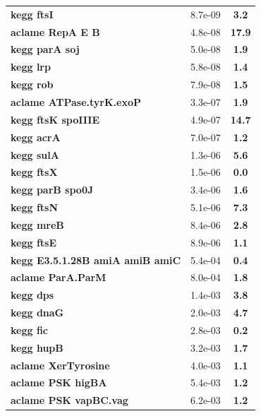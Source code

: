 \begin{landscape}
\begin{table}
{\begin{minipage}[t]{0.3\textwidth}
\begin{tabular}{>{\bfseries}p{\textwidth}cc}
\rowcolor{posit}kegg ftsI&8.7e-09&\textbf{\colorbox{colorpowerx}{3.2}}\\
\rowcolor{posit}aclame RepA E B&4.8e-08&\textbf{\colorbox{colorpowerxx}{17.9}}\\
\rowcolor{posit}kegg parA soj&5.0e-08&\textbf{\colorbox{colorpower}{1.9}}\\
\rowcolor{posit}kegg lrp&5.8e-08&\textbf{\colorbox{colorpower}{1.4}}\\
\rowcolor{posit}kegg rob&7.9e-08&\textbf{\colorbox{colorpower}{1.5}}\\
\rowcolor{posit}aclame ATPase.tyrK.exoP&3.3e-07&\textbf{\colorbox{colorpower}{1.9}}\\
\rowcolor{posit}kegg ftsK spoIIIE&4.9e-07&\textbf{\colorbox{colorpowerxx}{14.7}}\\
\rowcolor{posit}kegg acrA&7.0e-07&\textbf{\colorbox{colorpower}{1.2}}\\
\rowcolor{posit}kegg sulA&1.3e-06&\textbf{\colorbox{colorpowerx}{5.6}}\\
\rowcolor{posit}kegg ftsX&1.5e-06&\textbf{\colorbox{colorpowernegxxx}{0.0}}\\
\rowcolor{posit}kegg parB spo0J&3.4e-06&\textbf{\colorbox{colorpower}{1.6}}\\
\rowcolor{posit}kegg ftsN&5.1e-06&\textbf{\colorbox{colorpowerx}{7.3}}\\
\rowcolor{posit}kegg mreB&8.4e-06&\textbf{\colorbox{colorpowerx}{2.8}}\\
\rowcolor{posit}kegg ftsE&8.9e-06&\textbf{\colorbox{colorpower}{1.1}}\\
\rowcolor{posit}kegg E3.5.1.28B amiA amiB amiC&5.4e-04&\textbf{\colorbox{colorpowerneg}{0.4}}\\
\rowcolor{posit}aclame ParA.ParM&8.0e-04&\textbf{\colorbox{colorpower}{1.8}}\\
\rowcolor{posit}kegg dps&1.4e-03&\textbf{\colorbox{colorpowerx}{3.8}}\\
\rowcolor{posit}kegg dnaG&2.0e-03&\textbf{\colorbox{colorpowerx}{4.7}}\\
\rowcolor{posit}kegg fic&2.8e-03&\textbf{\colorbox{colorpowernegx}{0.2}}\\
\rowcolor{posit}kegg hupB&3.2e-03&\textbf{\colorbox{colorpower}{1.7}}\\
\rowcolor{posit}aclame XerTyrosine&4.0e-03&\textbf{\colorbox{colorpower}{1.1}}\\
\rowcolor{posit}aclame PSK higBA&5.4e-03&\textbf{\colorbox{colorpower}{1.2}}\\
\rowcolor{posit}aclame PSK vapBC.vag&6.2e-03&\textbf{\colorbox{colorpower}{1.2}}\\

\end{tabular}
\end{minipage}}
\end{table}
\end{landscape}
